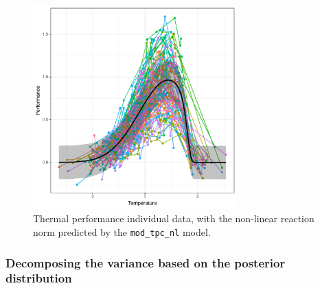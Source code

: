 \documentclass[a4paper,12pt,twoside]{article}
\begin{document}
\begin{figure}[h!]
  \includegraphics[width = 0.7\textwidth]{TPC_continuous_nonlinear_pred.pdf}
  \caption{Thermal performance individual data, with the non-linear reaction norm predicted by the \texttt{mod\_tpc\_nl} model.}
  \label{fig_pred_tpc_nl_ct}
\end{figure}

\subsubsection{Decomposing the variance based on the posterior distribution}
\end{document}
